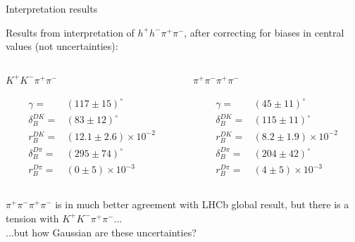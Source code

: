 \documentclass[xcolor={dvipsnames}]{beamer}
\begin{document}
\begin{frame}{Interpretation results}
  \begin{center}
    {\large Results from interpretation of $h^+h^-\pi^+\pi^-$, after correcting for biases in central values (not uncertainties):}
  \end{center}
  \vspace{-0.5cm}
  \begin{columns}
    \begin{column}{0.5\textwidth}
      \begin{center}
        $K^+K^-\pi^+\pi^-$
      \end{center}
      \begin{align*}
        \gamma =& (117 \pm 15)^\circ \\
        \delta_B^{DK} =& (83 \pm 12)^\circ \\
        r_B^{DK} =& (12.1 \pm 2.6)\times10^{-2} \\
        \delta_B^{D\pi} =& (295 \pm 74)^\circ \\
        r_B^{D\pi} =& (0 \pm 5)\times10^{-3}
      \end{align*}
    \end{column}
    \begin{column}{0.5\textwidth}
      \begin{center}
        $\pi^+\pi^-\pi^+\pi^-$
      \end{center}
      \begin{align*}
        \gamma =& (45 \pm 11)^\circ \\
        \delta_B^{DK} =& (115 \pm 11)^\circ \\
        r_B^{DK} =& (8.2 \pm 1.9)\times10^{-2} \\
        \delta_B^{D\pi} =& (204 \pm 42)^\circ \\
        r_B^{D\pi} =& (4 \pm 5)\times10^{-3}
      \end{align*}
    \end{column}
  \end{columns}
  \vspace{0.3cm}
  \begin{center}
    $\pi^+\pi^-\pi^+\pi^-$ is in much better agreement with LHCb global result, but there is a tension with $K^+K^-\pi^+\pi^-$...\\
    ...but how Gaussian are these uncertainties?
  \end{center}
\end{frame}
\end{document}
